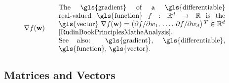 \begin{align}
	 &\nabla f(\weights) & \quad & \parbox{.70\textwidth}{The \gls{gradient} of a \gls{differentiable} real-valued \gls{function} 
	 	$f: \mathbb{R}^{\featuredim}\rightarrow \mathbb{R}$ is the \gls{vector} 
	 	$\nabla f(\weights) = \big( {\partial f}/{\partial \weight_{1}}, \,\ldots, \,{\partial f}/{\partial \weight_{\featuredim}}  \big)\,^{T} \in \mathbb{R}^{\featuredim}$ 
		\cite[Ch. 9]{RudinBookPrinciplesMatheAnalysis}.
		\\ See also: \gls{gradient}, \gls{differentiable}, \gls{function}, \gls{vector}.}   \nonumber
\end{align} 
\subsection*{Matrices and Vectors} 

